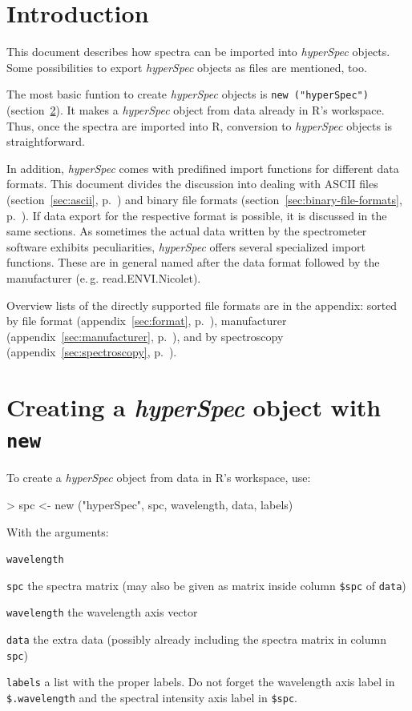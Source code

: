 \documentclass[english, a4paper, 10pt, headings=small, DIV11]{scrartcl}
\renewenvironment{Schunk}{\vspace{0pt}\begin{small}}{\end{small}\vspace{0pt}}
\newcommand{\Rcode}[2][]{\texorpdfstring{\nohyphens{#1\texttt{#2}}}{#2}}
\newcommand{\Rfunction}[2][]{\texorpdfstring{\nohyphens{#1\texttt{#2}}}{#2}}
\newcommand{\Rclass}[1]{\texorpdfstring{\nohyphens{\textit{#1}}}{#1}}
\newcommand{\phy}{\texorpdfstring{\nohyphens{\textit{hyperSpec}}}{hyperSpec}\xspace}
\newcommand{\chy}{\Rclass{hyperSpec}\xspace}
\newcommand{\eg}{e.\,g.\xspace}
\begin{document}
\section{Introduction}
This document describes how spectra can be imported into \chy objects. Some possibilities to export
\chy objects as files are mentioned, too.

The most basic funtion to create \chy objects is \Rfunction{new ("hyperSpec")}
(section~\ref{sec:new}). It makes a \chy object from data already in R's workspace. Thus, once the
spectra are imported into R, conversion to \chy objects is straightforward.

In addition, \phy comes with predifined import functions for different data formats.  This document
divides the discussion into dealing with ASCII files (section~\ref{sec:ascii},
p.~\pageref{sec:ascii}) and binary file formats (section~\ref{sec:binary-file-formats},
p.~\pageref{sec:binary-file-formats}).  If data export for the respective format is possible, it is
discussed in the same sections.  As sometimes the actual data written by the spectrometer software
exhibits peculiarities, \phy offers several specialized import functions. These are in general named
after the data format followed by the manufacturer (\eg read.ENVI.Nicolet).

Overview lists of the directly supported file formats are in the appendix: sorted by file format
(appendix~\ref{sec:format}, p.~\pageref{sec:format}), manufacturer (appendix~\ref{sec:manufacturer},
p.~\pageref{sec:manufacturer}), and by spectroscopy (appendix~\ref{sec:spectroscopy},
p.~\pageref{sec:spectroscopy}).

\section{Creating a \chy object with \Rfunction{new}}
\label{sec:new}
To create a \Rclass{hyperSpec} object from data in R's workspace, use:
\begin{Schunk}
\begin{Sinput}
> spc <- new ("hyperSpec", spc, wavelength, data, labels)
\end{Sinput}
\end{Schunk}

With the arguments:
\begin{labeling}{\Rcode{wavelength}}
\item [\Rcode{spc}] the spectra matrix (may also be given as matrix inside column \Rcode{\$spc} of \Rcode{data})
\item [\Rcode{wavelength}] the wavelength axis vector
\item [\Rcode{data}] the extra data (possibly already including the spectra matrix in column
\texttt{spc})
\item [\Rcode{labels}] a list with the proper labels. Do not forget the
wavelength axis label in \Rcode{\$.wavelength} and the spectral intensity
axis label in \Rcode{\$spc}.
\end{labeling}
\end{document}
